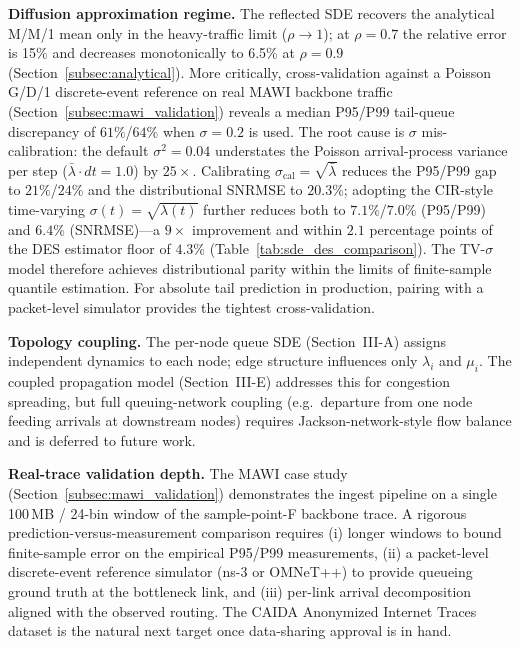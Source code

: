 \documentclass{ieeeaccess}
\begin{document}
\par\textbf{Diffusion approximation regime.} The reflected SDE recovers the analytical M/M/1
mean only in the heavy-traffic limit ($\rho\!\to\!1$); at $\rho=0.7$ the relative error is 15\%
and decreases monotonically to 6.5\% at $\rho=0.9$ (Section~\ref{subsec:analytical}). More critically,
cross-validation against a Poisson G/D/1 discrete-event reference on real MAWI backbone traffic
(Section~\ref{subsec:mawi_validation}) reveals a median P95/P99 tail-queue discrepancy of
$61\%$/$64\%$ when $\sigma{=}0.2$ is used. The root cause is $\sigma$ mis-calibration: the
default $\sigma^2{=}0.04$ understates the Poisson arrival-process variance per step ($\bar\lambda
\cdot dt\!=\!1.0$) by $25\times$. Calibrating $\sigma_{\mathrm{cal}}{=}\sqrt{\bar\lambda}$
reduces the P95/P99 gap to $21\%$/$24\%$ and the distributional SNRMSE to $20.3\%$;
adopting the CIR-style time-varying $\sigma(t){=}\sqrt{\lambda(t)}$ further reduces both
to $\mathbf{7.1\%}$/$\mathbf{7.0\%}$ (P95/P99) and $\mathbf{6.4\%}$ (SNRMSE)---a $9\times$
improvement and within $2.1$ percentage points of the DES estimator floor of $4.3\%$
(Table~\ref{tab:sde_des_comparison}). The TV-$\sigma$ model therefore achieves distributional
parity within the limits of finite-sample quantile estimation. For absolute tail prediction
in production, pairing with a packet-level simulator provides the tightest cross-validation.

\par\textbf{Topology coupling.} The per-node queue SDE (Section~III-A) assigns independent
dynamics to each node; edge structure influences only $\lambda_i$ and $\mu_i$. The coupled
propagation model (Section~III-E) addresses this for congestion spreading, but full
queuing-network coupling (e.g.\ departure from one node feeding arrivals at downstream nodes)
requires Jackson-network-style flow balance and is deferred to future work.

\par\textbf{Real-trace validation depth.} The MAWI case study
(Section~\ref{subsec:mawi_validation}) demonstrates the ingest pipeline on a single 100\,MB /
24-bin window of the sample-point-F backbone trace. A rigorous prediction-versus-measurement
comparison requires (i) longer windows to bound finite-sample error on the empirical P95/P99
measurements, (ii) a packet-level discrete-event reference simulator (ns-3 or OMNeT++) to
provide queueing ground truth at the bottleneck link, and (iii) per-link arrival decomposition
aligned with the observed routing. The CAIDA Anonymized Internet Traces dataset is the natural
next target once data-sharing approval is in hand.
\end{document}
